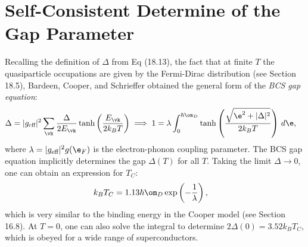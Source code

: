 \documentclass[a4paper, 11pt, normalem]{report}
\begin{document}
\section{Self-Consistent Determine of the Gap Parameter}
Recalling the definition of $\Delta$ from Eq (18.13), the fact that at finite $T$ the quasiparticle occupations are given by the Fermi-Dirac distribution (see Section 18.5), Bardeen, Cooper, and Schrieffer obtained the general form of the \emph{BCS gap equation}:
\begin{align}
    \Delta &= |g_{\text{eff}}|^2\sum_{\vk} \frac{\Delta}{2E_{\vk}}\tanh\left(\frac{E_{\vk}}{2k_BT}\right) \implies 1 = \lambda \int_0^{\hbar\om_D} \tanh\left(\frac{\sqrt{\e^2+|\Delta|^2}}{2k_BT}\right)\,d\e,
\end{align}
where $\lambda=|g_{\text{eff}}|^2g(\e_F)$ is the electron-phonon coupling parameter.
The BCS gap equation implicitly determines the gap $\Delta(T)$ for all $T$.
Taking the limit $\Delta\to0$, one can obtain an expression for $T_C$:
\begin{align}
    k_BT_C &= 1.13\hbar\om_D\exp\left(-\frac{1}{\lambda}\right),
\end{align}
which is very similar to the binding energy in the Cooper model (see Section 16.8).
At $T=0$, one can also solve the integral to determine $2\Delta(0)=3.52k_BT_C$, which is obeyed for a wide range of superconductors.
\end{document}
